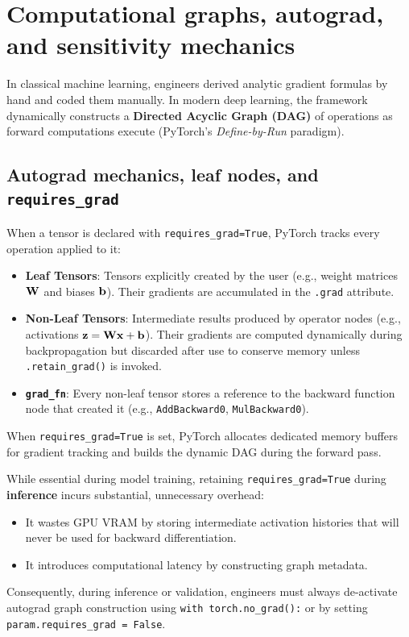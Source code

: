 \documentclass[../labs.tex]{subfiles}
\begin{document}
\section{Computational graphs, autograd, and sensitivity mechanics}

In classical machine learning, engineers derived analytic gradient formulas by hand and coded them manually. In modern deep learning, the framework dynamically constructs a \textbf{Directed Acyclic Graph (DAG)} of operations as forward computations execute (PyTorch's \emph{Define-by-Run} paradigm).

\subsection{Autograd mechanics, leaf nodes, and \texttt{requires\_grad}}
When a tensor is declared with \texttt{requires\_grad=True}, PyTorch tracks every operation applied to it:
\begin{itemize}
    \item \textbf{Leaf Tensors}: Tensors explicitly created by the user (e.g., weight matrices $\mathbf{W}$ and biases $\mathbf{b}$). Their gradients are accumulated in the \texttt{.grad} attribute.
    \item \textbf{Non-Leaf Tensors}: Intermediate results produced by operator nodes (e.g., activations $\mathbf{z} = \mathbf{W} \mathbf{x} + \mathbf{b}$). Their gradients are computed dynamically during backpropagation but discarded after use to conserve memory unless \texttt{.retain\_grad()} is invoked.
    \item \textbf{\texttt{grad\_fn}}: Every non-leaf tensor stores a reference to the backward function node that created it (e.g., \texttt{AddBackward0}, \texttt{MulBackward0}).
\end{itemize}

\begin{examinsight}
When \texttt{requires\_grad=True} is set, PyTorch allocates dedicated memory buffers for gradient tracking and builds the dynamic DAG during the forward pass. 

While essential during model training, retaining \texttt{requires\_grad=True} during \textbf{inference} incurs substantial, unnecessary overhead:
\begin{itemize}
    \item It wastes GPU VRAM by storing intermediate activation histories that will never be used for backward differentiation.
    \item It introduces computational latency by constructing graph metadata.
\end{itemize}
Consequently, during inference or validation, engineers must always de-activate autograd graph construction using \texttt{with torch.no\_grad():} or by setting \texttt{param.requires\_grad = False}.
\end{examinsight}
\end{document}
